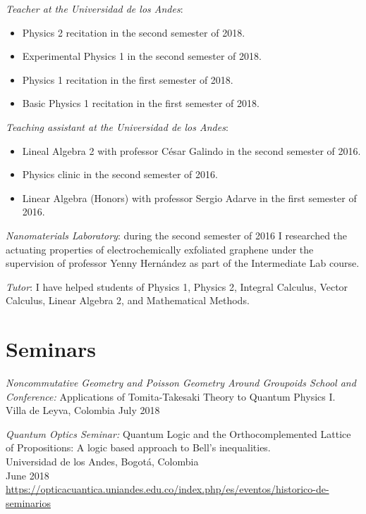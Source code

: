 \documentclass[line,margin]{res}
\begin{document}
\begin{resume}
{\sl Teacher at the Universidad de los Andes}:
\begin{itemize}

\item Physics 2 recitation in the second semester of 2018.

\item Experimental Physics 1 in the second semester of 2018.

\item Physics 1 recitation in the first semester of 2018.

\item Basic Physics 1 recitation in the first semester of 2018.

\end{itemize}

{\sl Teaching assistant at the Universidad de los Andes}: 
\begin{itemize}

\item Lineal Algebra 2 with professor César Galindo in the second semester of 2016.

\item Physics clinic in the second semester of 2016.

\item Linear Algebra (Honors) with professor Sergio Adarve in the first semester of 2016.

\end{itemize}

{\sl Nanomaterials Laboratory}: during the second semester of 2016 I researched the actuating properties of electrochemically exfoliated graphene under the supervision of professor Yenny Hernández as part of the Intermediate Lab course.
  
{\sl Tutor}: I have helped students of Physics 1, Physics 2, Integral Calculus, Vector Calculus, Linear Algebra 2, and Mathematical Methods.

\section{Seminars}

{\sl Noncommutative Geometry and Poisson Geometry Around Groupoids School and Conference:} Applications of Tomita-Takesaki Theory to Quantum Physics I.\\
Villa de Leyva, Colombia
July 2018

{\sl Quantum Optics Seminar:} Quantum Logic and the Orthocomplemented Lattice of Propositions: A logic based approach to Bell's inequalities.\\
Universidad de los Andes, Bogotá, Colombia\\
June 2018\\
\url{https://opticacuantica.uniandes.edu.co/index.php/es/eventos/historico-de-seminarios}


\end{resume}
\end{document}
